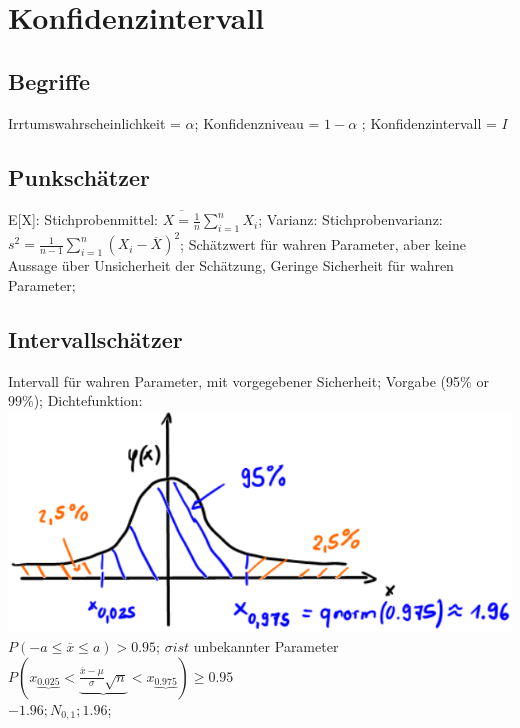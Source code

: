 \section{Konfidenzintervall}
  \subsection{Begriffe}
   Irrtumswahrscheinlichkeit = $ \alpha $; 
  Konfidenzniveau =  $ 1-\alpha $ ; 
  Konfidenzintervall = $ I $
  \subsection{Punkschätzer}
  E[X]: Stichprobenmittel:
  $ \overline{X = \frac{1}{n}} \sum_{i=1}^{n} X_{i}$; 
  Varianz: Stichprobenvarianz:
  $ s^{2} = \frac{1}{n -1} \sum_{i=1}^{n} (X_{i} - \overline{X})^{2} $; 
  Schätzwert für wahren Parameter, aber keine Aussage über Unsicherheit der Schätzung, Geringe Sicherheit für wahren Parameter; 
  
  \subsection{Intervallschätzer}
  Intervall für wahren Parameter, mit vorgegebener Sicherheit; Vorgabe (95\% or 99\%); 
  Dichtefunktion:
  \includegraphics[scale=0.25]{./pic/KonfidenzintervallDichtefunktion.png}
  $ P(-a \le \overline{x} \le a) > 0.95 $; 
  $ \sigma ist $ unbekannter Parameter\\
  $ P( x_{\underbrace{0.025}} < \underbrace{ \frac{\overline{x} - \mu}{\sigma}\sqrt{n} } < x_{\underbrace{0.975}} ) \ge 0.95 $\\
  $ -1.96; N_{0,1}; 1.96 $; 
  
